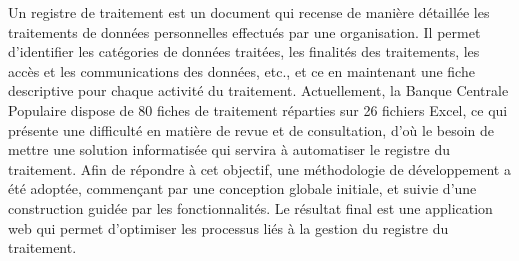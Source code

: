 \begin{resume}
    Un registre de traitement est un document qui recense de manière détaillée les traitements de données personnelles effectués par une organisation. Il permet d'identifier les catégories de données traitées, les finalités des traitements, les accès et les communications des données, etc., et ce en maintenant une fiche descriptive pour chaque activité du traitement. Actuellement, la Banque Centrale Populaire dispose de 80 fiches de traitement réparties sur 26 fichiers Excel, ce qui présente une difficulté en matière de revue et de consultation, d'où le besoin de mettre une solution informatisée qui servira à automatiser le registre du traitement. Afin de répondre à cet objectif, une méthodologie de développement a été adoptée, commençant par une conception globale initiale, et suivie d'une construction guidée par les fonctionnalités. Le résultat final est une application web qui permet d’optimiser les processus liés à la gestion du registre du traitement.
\end{resume}